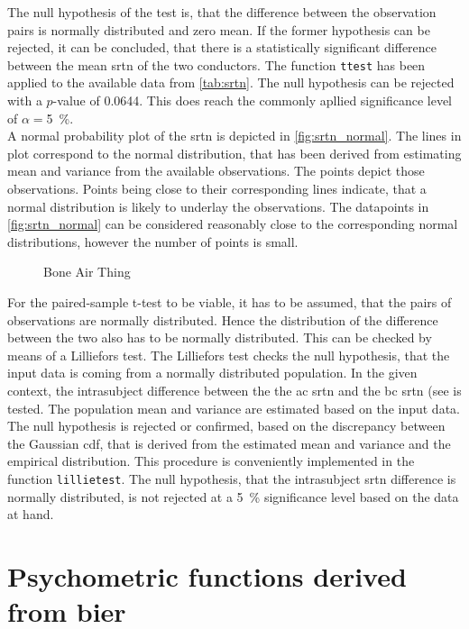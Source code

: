 The null hypothesis of the test is, that the difference between the observation pairs is normally distributed and zero mean. If the former hypothesis can be rejected, it can be concluded, that there is a statistically significant difference between the mean \gls{srtn} of the two conductors.
The \matlab function \texttt{ttest} has been applied to the available data from \autoref{tab:srtn}. The null hypothesis can be rejected with a $p$-value of 0.0644. This does reach the commonly apllied significance level of $\alpha=$\SI{5}{\percent}.\\
A normal probability plot of the \gls{srtn} is depicted in \autoref{fig:srtn_normal}. The lines in plot correspond to the normal distribution, that has been derived from estimating mean and variance from the available observations. 
The points depict those observations. Points being close to their corresponding lines indicate, that a normal distribution is likely to underlay the observations. The datapoints in \autoref{fig:srtn_normal} can be considered reasonably close to the corresponding normal distributions, however the number of points is small.\\
\begin{figure}[H]
\centering

\caption{Bone Air Thing}
\label{fig:srtn_normal}
\end{figure}
For the paired-sample t-test to be viable, it has to be assumed, that the pairs of observations are normally distributed. Hence the distribution of the difference between the two also has to be normally distributed. 
This can be checked by means of a Lilliefors test.
The Lilliefors test checks the null hypothesis, that the input data is coming from a normally distributed population. 
In the given context, the intrasubject difference between the the \gls{ac} \gls{srtn} and the \gls{bc} \gls{srtn} (see  is tested.
The population mean and variance are estimated based on the input data. The null hypothesis is rejected or confirmed, based on the discrepancy between the Gaussian \gls{cdf}, that is derived from the estimated mean and variance and the empirical distribution.
This procedure is conveniently implemented in the \matlab function \texttt{lillietest}.
The null hypothesis, that the intrasubject \gls{srtn} difference is normally distributed, is not rejected at a \SI{5}{\percent} significance level based on the data at hand.\\

\section{Psychometric functions derived from \gls{bier}}\label{sec:result_psycho}

